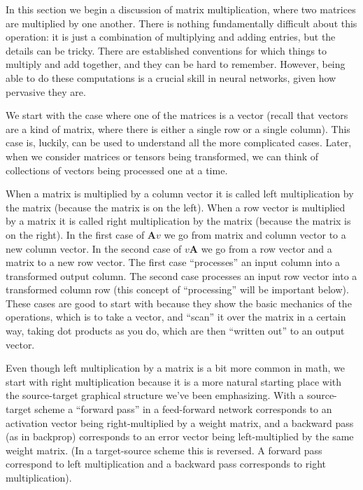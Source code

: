 In this section we begin a discussion of matrix multiplication, where two matrices are multiplied by one another. There is nothing fundamentally difficult about this operation: it is just a combination of multiplying and adding entries, but the details can be tricky. There are established conventions for which things to multiply and add together, and they can be hard to remember. However, being able to do these computations is a crucial skill in neural networks, given how pervasive they are. 

We start with the case where one of the matrices is a vector (recall that vectors are a kind of matrix, where there is either a single row or a single column). This case is, luckily, can be used to understand all the more complicated cases. Later, when we consider matrices or tensors being transformed, we can think of collections of vectors being processed one at a time.

When a matrix is multiplied by a column vector it is called left multiplication by the matrix (because the matrix is on the left). When a row vector is multiplied by a matrix it is called right multiplication by the matrix (because the matrix is on the right). In the first case of $\mathbf{A}v$ we go from matrix and column vector to a new column vector. In the second case of $v\mathbf{A}$ we go from a row vector and a matrix to a new row vector. The first case ``processes'' an input column into a transformed output column. The second case processes an input row vector into a transformed column row (this concept of ``processing'' will be important below). These cases are good to start with because they show the basic mechanics of the operations, which is to take a vector, and ``scan'' it over the matrix in a certain way, taking dot products as you do, which are then ``written out'' to an output vector. 

Even though left multiplication by a matrix is a bit more common in math, we start with right multiplication because it is a more natural starting place with the source-target graphical structure we've been emphasizing. With a source-target scheme a  ``forward pass'' in a feed-forward network corresponds to an activation vector being right-multiplied by a weight matrix, and a backward pass (as in backprop) corresponds to an error vector being left-multiplied by the same weight matrix. (In a target-source scheme this is reversed. A forward pass correspond to left multiplication and a backward pass corresponds to right multiplication).

